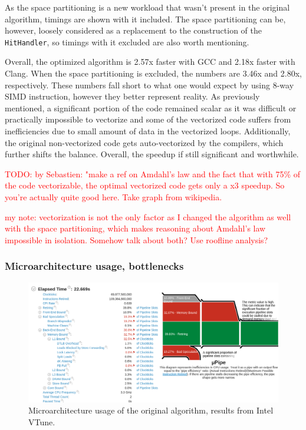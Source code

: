 \documentclass[12pt]{article}
\newcommand{\code}[1]{\texttt{#1}}
\begin{document}
As the space partitioning is a new workload that wasn't present in the original algorithm, timings are shown with it included. The space partitioning can be, however, loosely considered as a replacement to the construction of the \code{HitHandler}, so timings with it excluded are also worth mentioning.

Overall, the optimized algorithm is 2.57x faster with GCC and 2.18x faster with Clang. When the space partitioning is excluded, the numbers are 3.46x and 2.80x, respectively. These numbers fall short to what one would expect by using 8-way SIMD instruction, however they better represent reality. As previously mentioned, a significant portion of the code remained scalar as it was difficult or practically impossible to vectorize and some of the vectorized code suffers from inefficiencies due to small amount of data in the vectorized loops. Additionally, the original non-vectorized code gets auto-vectorized by the compilers, which further shifts the balance. Overall, the speedup if still significant and worthwhile.


\textcolor{red}{TODO: by Sebastien: "make a ref on Amdahl's law and the fact that with 75\% of the code vectorizable, the optimal vectorized code gets only a x3 speedup. So you're actually quite good here. Take graph from wikipedia.}

\textcolor{red}{my note: vectorization is not the only factor as I changed the algorithm as well with the space partitioning, which makes reasoning about Amdahl's law impossible in isolation. Somehow talk about both? Use roofline analysis?}


\subsubsection{Microarchitecture usage, bottlenecks}

\begin{figure}[H]
	\begin{center}
		\includegraphics[width=\textwidth]{velout_uarch_overall_orig}
	\end{center}
	\caption{Microarchitecture usage of the original algorithm, results from Intel VTune.}
	\label{fig_velout_uarch_overall_orig}
\end{figure}
\end{document}
